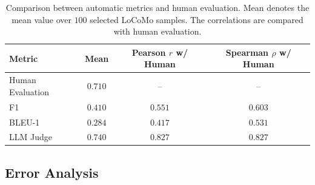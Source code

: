 \documentclass{article} %
\begin{document}
\begin{table}[tb]
\vspace{-10pt}
\centering
\small
\caption{Comparison between automatic metrics and human evaluation. Mean denotes the mean value over $100$ selected LoCoMo samples. The correlations are compared with human evaluation.}
\vspace{0.2em}
\begin{tabular}{l|ccc}
\toprule
Metric & \textbf{Mean} & \textbf{Pearson $r$ w/ Human} & \textbf{Spearman $\rho$ w/ Human} \\ \toprule
Human Evaluation & $0.710$ & -- & -- \\
F1               & $0.410$ & $0.551$ & $0.603$ \\
BLEU-1           & $0.284$ & $0.417$ & $0.531$ \\
LLM Judge        & $0.740$ & $\mathbf{0.827}$ & $\mathbf{0.827}$ \\ 
\bottomrule
\end{tabular}
\label{tab:metrics_human_correlation}
\end{table}


\subsection{Error Analysis}
\end{document}

